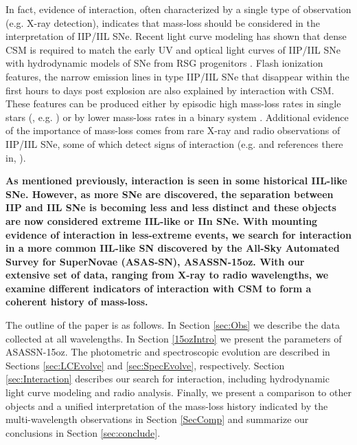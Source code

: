 \documentclass[a4paper,fleqn,usenatbib]{mnras}
\begin{document}
In fact, evidence of interaction, often characterized by a single type of observation (e.g. X-ray detection), indicates that mass-loss should be considered in the interpretation of IIP/IIL SNe.
Recent light curve modeling has shown that dense CSM is required to match the early UV and optical light curves of IIP/IIL SNe with hydrodynamic models of SNe from RSG progenitors \citep{2015gezari,2018morozova,2018paxton,2018foerster}.  
Flash ionization features, the narrow emission lines in type IIP/IIL SNe that disappear within the first hours to days post explosion are also explained by interaction with CSM. 
These features can be produced either by episodic high mass-loss rates in single stars (\citealt{2014gal-yam}, e.g. \citealt{ 2017yaron}) or by lower mass-loss rates in a binary system \citep{2018kochanek}.
Additional evidence of the importance of mass-loss comes from rare X-ray and radio observations of IIP/IIL SNe, some of which detect signs of interaction (e.g. \citealt{2014dwarkadas} and references there in, \citealt{2018morozova2}).

\textbf{As mentioned previously, interaction is seen in some historical IIL-like SNe. However, as more SNe are discovered, the separation between IIP and IIL SNe is becoming less and less distinct and these objects are now considered extreme IIL-like or IIn SNe.
With mounting evidence of interaction in less-extreme events, we search for interaction in a more common IIL-like SN discovered by the All-Sky Automated Survey for SuperNovae (ASAS-SN), ASASSN-15oz.
With our extensive set of data, ranging from X-ray to radio wavelengths, we examine different indicators of interaction with CSM to form a coherent history of mass-loss.}

The outline of the paper is as follows.
In Section \ref{sec:Obs} we describe the data collected at all wavelengths.
In Section \ref{15ozIntro} we present the parameters of ASASSN-15oz.
The photometric and spectroscopic evolution are described in Sections \ref{sec:LCEvolve} and \ref{sec:SpecEvolve}, respectively.
Section \ref{sec:Interaction} describes our search for interaction, including hydrodynamic light curve modeling and radio analysis.
Finally, we present a comparison to other objects and a unified interpretation of the mass-loss history indicated by the multi-wavelength observations  in Section \ref{SecComp} and summarize our conclusions in Section \ref{sec:conclude}.
\end{document}
